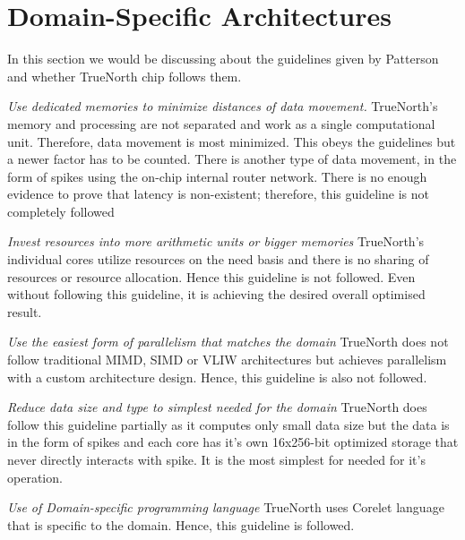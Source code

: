 \documentclass[11pt,twoside]{article}
\begin{document}
\section{Domain-Specific Architectures}
\label{sec:dsa}
In this section we would be discussing about the guidelines given by Patterson \cite{Hennessy_Patterson_2017} and whether TrueNorth chip follows them.
\begin{compactenum}
	\item \textit{Use dedicated memories to minimize distances of data movement.} \newline TrueNorth's memory and processing are not separated and work as a single computational unit. Therefore, data movement is most minimized. This obeys the guidelines but a newer factor has to be counted. There is another type of data movement, in the form of spikes using the on-chip internal router network. There is no enough evidence to prove that latency is non-existent; therefore, this guideline is not completely followed 
	\item \textit{Invest resources into more arithmetic units or bigger memories} \newline TrueNorth's individual cores utilize resources on the need basis and there is no sharing of resources or resource allocation. Hence this guideline is not followed. Even without following this guideline, it is achieving the desired overall optimised result.
	\item \textit{Use the easiest form of parallelism that matches the domain} \newline TrueNorth does not follow traditional MIMD, SIMD or VLIW architectures but achieves parallelism with a custom architecture design. Hence, this guideline is also not followed.
	\item \textit{Reduce data size and type to simplest needed for the domain} \newline TrueNorth does follow this guideline partially as it computes only small data size but the data is in the form of spikes and each core has it's own 16x256-bit optimized storage that never directly interacts with spike. It is the most simplest for needed for it's operation.  
	\item \textit{Use of Domain-specific programming language} \newline TrueNorth uses Corelet language that is specific to the domain. Hence, this guideline is followed. 
\end{compactenum}


\end{document}
